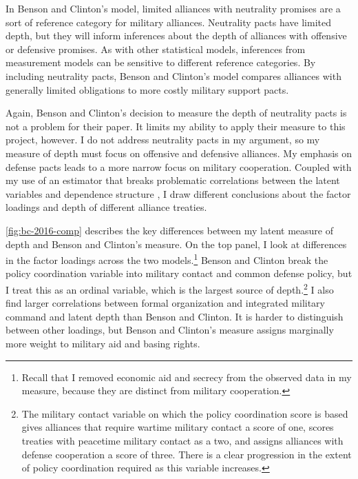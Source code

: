 \documentclass[12pt]{article}
\begin{document}
In Benson and Clinton's model, limited alliances with neutrality promises are a sort of reference category for military alliances. 
Neutrality pacts have limited depth, but they will inform inferences about the depth of alliances with offensive or defensive promises. 
As with other statistical models, inferences from measurement models can be sensitive to different reference categories. 
By including neutrality pacts, Benson and Clinton's model compares alliances with generally limited obligations to more costly military support pacts.


Again, Benson and Clinton's decision to measure the depth of neutrality pacts is not a problem for their paper. 
It limits my ability to apply their measure to this project, however. 
I do not address neutrality pacts in my argument, so my measure of depth must focus on offensive and defensive alliances. 
My emphasis on defense pacts leads to a more narrow focus on military cooperation.
Coupled with my use of an estimator that breaks problematic correlations between the latent variables and dependence structure \citep{Murrayetal2013}, I draw different conclusions about the factor loadings and depth of different alliance treaties. 


\autoref{fig:bc-2016-comp} describes the key differences between my latent measure of depth and Benson and Clinton's measure.
On the top panel, I look at differences in the factor loadings across the two models.\footnote{Recall that I removed economic aid and secrecy from the observed data in my measure, because they are distinct from military cooperation.} 
Benson and Clinton break the policy coordination variable into military contact and common defense policy, but I treat this as an ordinal variable, which is the largest source of depth.\footnote{The military contact variable on which the policy coordination score is based gives alliances that require wartime military contact a score of one, scores treaties with peacetime military contact as a two, and assigns alliances with defense cooperation a score of three. There is a clear progression in the extent of policy coordination required as this variable increases.}
I also find larger correlations between formal organization and integrated military command and latent depth than Benson and Clinton.
It is harder to distinguish between other loadings, but Benson and Clinton's measure assigns marginally more weight to military aid and basing rights.  
\end{document}
